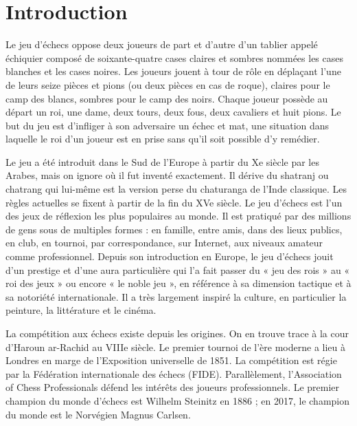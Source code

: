 \documentclass[a5paper,openany,twocolumn]{book}
\begin{document}
\twocolumn

\onecolumn

\chapter{Introduction}\thispagestyle{empty}

Le jeu d’échecs oppose deux joueurs de part et d’autre d’un tablier appelé échiquier composé de soixante-quatre cases claires et sombres nommées les cases blanches et les cases noires. Les joueurs jouent à tour de rôle en déplaçant l'une de leurs seize pièces et pions (ou deux pièces en cas de roque), claires pour le camp des blancs, sombres pour le camp des noirs. Chaque joueur possède au départ un roi, une dame, deux tours, deux fous, deux cavaliers et huit pions. Le but du jeu est d'infliger à son adversaire un échec et mat, une situation dans laquelle le roi d'un joueur est en prise sans qu'il soit possible d'y remédier.

\medskip

Le jeu a été introduit dans le Sud de l'Europe à partir du Xe siècle par les Arabes, mais on ignore où il fut inventé exactement. Il dérive du shatranj ou chatrang qui lui-même est la version perse du chaturanga de l'Inde classique. Les règles actuelles se fixent à partir de la fin du XVe siècle. Le jeu d’échecs est l'un des jeux de réflexion les plus populaires au monde. Il est pratiqué par des millions de gens sous de multiples formes : en famille, entre amis, dans des lieux publics, en club, en tournoi, par correspondance, sur Internet, aux niveaux amateur comme professionnel. Depuis son introduction en Europe, le jeu d'échecs jouit d'un prestige et d'une aura particulière qui l’a fait passer du « jeu des rois » au  « roi des jeux » ou encore « le noble jeu », en référence à sa dimension tactique et à sa notoriété internationale. Il a très largement inspiré la culture, en particulier la peinture, la littérature et le cinéma.

\medskip

La compétition aux échecs existe depuis les origines. On en trouve trace à la cour d'Haroun ar-Rachid au VIIIe siècle. Le premier tournoi de l'ère moderne a lieu à Londres en marge de l'Exposition universelle de 1851. La compétition est régie par la Fédération internationale des échecs (FIDE). Parallèlement, l'Association of Chess Professionals défend les intérêts des joueurs professionnels. Le premier champion du monde d'échecs est Wilhelm Steinitz en 1886 ; en 2017, le champion du monde est le Norvégien Magnus Carlsen.
\end{document}

